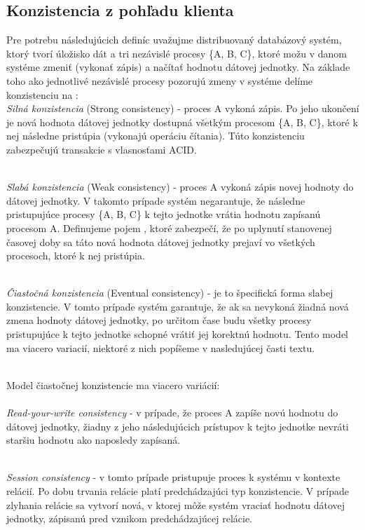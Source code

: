 \documentclass[11pt,twoside,a4paper]{book}
\begin{document}
\subsection{Konzistencia z pohľadu klienta}

Pre potrebu následujúcich definíc uvažujme distribuovaný databázový systém, ktorý tvorí úložisko dát a tri nezávislé procesy \{A, B, C\}, ktoré možu v danom systéme zmeniť (vykonať zápis) a načítať hodnotu dátovej jednotky. Na základe toho ako jednotlivé nezávislé procesy pozorujú zmeny v systéme delíme konzistenciu  na \cite{vogels2009eventually}: \\

\noindent 
\emph{Silná konzistencia} (Strong consistency) - proces A vykoná zápis. Po jeho ukončení je nová hodnota dátovej jednotky dostupná všetkým procesom \{A, B, C\}, ktoré k nej následne pristúpia (vykonajú operáciu čítania). Túto konzistenciu zabezpečujú transakcie s vlasnosťami ACID.

\noindent 
\\
\emph{Slabá konzistencia} (Weak consistency) - proces A vykoná zápis novej hodnoty do dátovej jednotky. V takomto prípade systém negarantuje, že následne pristupujúce procesy \{A, B, C\} k tejto jednotke vrátia hodnotu zapísanú procesom A. Definujeme pojem , ktoré zabezpečí, že po uplynutí stanovenej časovej doby sa táto nová hodnota dátovej jednotky prejaví vo všetkých procesoch, ktoré k nej pristúpia.

\noindent 
\\
\emph{Čiastočná konzistencia} (Eventual consistency) - je to špecifická forma slabej konzistencie. V tomto prípade systém garantuje, že ak sa nevykoná žiadná nová zmena hodnoty dátovej jednotky, po určitom čase budu všetky procesy pristupujúce k tejto jednotke schopné vrátiť jej korektnú hodnotu. Tento model ma viacero variacií, niektoré z nich popíšeme v nasledujúcej časti textu.

\noindent 
\\
Model čiastočnej konzistencie ma viacero variácií:\\
\noindent 
\\
\emph{Read-your-write consistency} - v prípade, že proces A zapíše novú hodnotu do dátovej jednotky, žiadny z jeho následujúcich prístupov k tejto jednotke nevráti staršiu hodnotu ako naposledy zapísaná.

\noindent
\\
\emph{Session consistency} - v tomto prípade pristupuje proces k systému v kontexte relácií. Po dobu trvania relácie platí predchádzajúci typ konzistencie. V prípade zlyhania relácie sa vytvorí nová, v ktorej môže systém vraciať hodnotu dátovej jednotky, zápisanú pred vznikom predchádzajúcej relácie.
\end{document}
